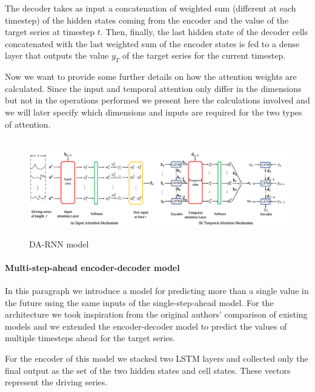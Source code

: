 \documentclass{article}
\begin{document}
The decoder takes as input a concatenation of weighted sum (different at each
timestep) of the hidden states coming
from the encoder and the value of the target series at timestep $t$. Then,
finally, the last hidden state of the decoder
cells concatenated with the last weighted sum of the encoder states is fed to a
dense layer that outputs the value
$y_T$ of the target series for the current timestep.

Now we want to provide some further details on how the attention weights are 
calculated. Since the input and temporal attention only differ in the dimensions 
but not in the operations performed we present here the calculations involved and 
we will later specify which dimensions and inputs are required for the two types 
of attention.

\begin{equation} \label{eq:attention}
\begin{split}

\end{split}
\end{equation}

\begin{figure}[ht]
\centering
\includegraphics[width=\linewidth]{img/da-rnn.png} \\
\caption{DA-RNN model}
\label{fig:da-rnn}
\end{figure}


\paragraph{Multi-step-ahead encoder-decoder model}

In this paragraph we introduce a model for predicting more than a single value in 
the future using the same inputs of the single-step-ahead model. 
For the architecture we took inspiration from the original authors' comparison of
existing models and we extended the encoder-decoder model to predict the values
of multiple timesteps ahead for the target series.

For the encoder of this model we stacked two LSTM layers and collected only the 
final output as the set of the two hidden states and cell states. These vectors
represent the driving series.
\end{document}
